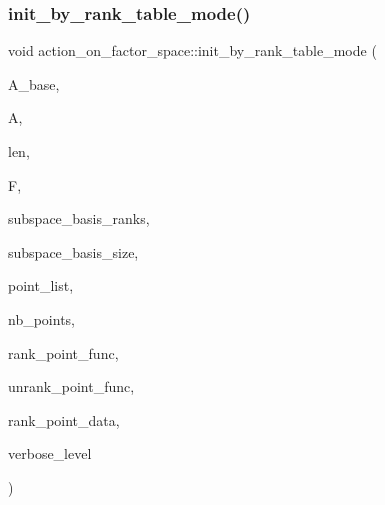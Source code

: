 \subsubsection{\texorpdfstring{init\+\_\+by\+\_\+rank\+\_\+table\+\_\+mode()}{init\_by\_rank\_table\_mode()}}
{\footnotesize\ttfamily void action\+\_\+on\+\_\+factor\+\_\+space\+::init\+\_\+by\+\_\+rank\+\_\+table\+\_\+mode (\begin{DoxyParamCaption}\item[{\mbox{\hyperlink{classaction}{action}} \&}]{A\+\_\+base,  }\item[{\mbox{\hyperlink{classaction}{action}} \&}]{A,  }\item[{\mbox{\hyperlink{galois_8h_a09fddde158a3a20bd2dcadb609de11dc}{I\+NT}}}]{len,  }\item[{\mbox{\hyperlink{classfinite__field}{finite\+\_\+field}} $\ast$}]{F,  }\item[{\mbox{\hyperlink{galois_8h_a09fddde158a3a20bd2dcadb609de11dc}{I\+NT}} $\ast$}]{subspace\+\_\+basis\+\_\+ranks,  }\item[{\mbox{\hyperlink{galois_8h_a09fddde158a3a20bd2dcadb609de11dc}{I\+NT}}}]{subspace\+\_\+basis\+\_\+size,  }\item[{\mbox{\hyperlink{galois_8h_a09fddde158a3a20bd2dcadb609de11dc}{I\+NT}} $\ast$}]{point\+\_\+list,  }\item[{\mbox{\hyperlink{galois_8h_a09fddde158a3a20bd2dcadb609de11dc}{I\+NT}}}]{nb\+\_\+points,  }\item[{\mbox{\hyperlink{galois_8h_a09fddde158a3a20bd2dcadb609de11dc}{I\+NT}}($\ast$)(\mbox{\hyperlink{galois_8h_a09fddde158a3a20bd2dcadb609de11dc}{I\+NT}} $\ast$\mbox{\hyperlink{simeon_8_c_aeb3f3030944801b163bc3b829a7f6710}{v}}, void $\ast$data)}]{rank\+\_\+point\+\_\+func,  }\item[{void($\ast$)(\mbox{\hyperlink{galois_8h_a09fddde158a3a20bd2dcadb609de11dc}{I\+NT}} $\ast$\mbox{\hyperlink{simeon_8_c_aeb3f3030944801b163bc3b829a7f6710}{v}}, \mbox{\hyperlink{galois_8h_a09fddde158a3a20bd2dcadb609de11dc}{I\+NT}} rk, void $\ast$data)}]{unrank\+\_\+point\+\_\+func,  }\item[{void $\ast$}]{rank\+\_\+point\+\_\+data,  }\item[{\mbox{\hyperlink{galois_8h_a09fddde158a3a20bd2dcadb609de11dc}{I\+NT}}}]{verbose\+\_\+level }\end{DoxyParamCaption})}

\mbox{\label{classaction__on__factor__space_a6350f7cf938babd5be3847ac7c8eaac8}} 
